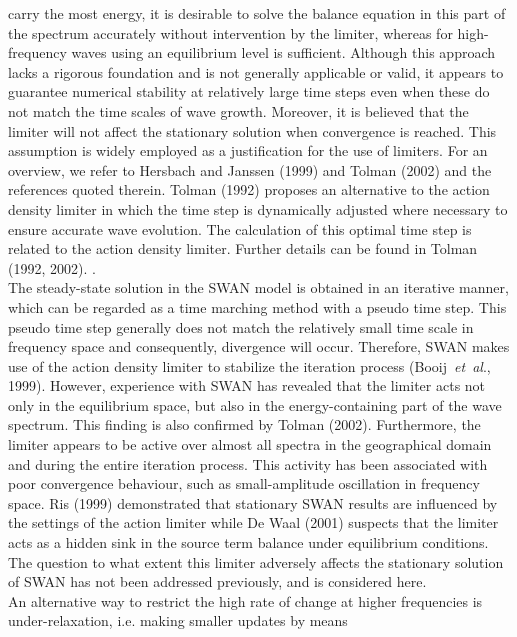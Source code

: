 \documentclass[12pt]{book}
\begin{document}
carry the most energy, it is desirable to solve the balance equation in this
part of the spectrum accurately without intervention by the limiter, whereas
for high-frequency waves using an equilibrium level is sufficient. Although this approach lacks a rigorous
foundation and is not generally applicable or valid, it appears to
guarantee numerical stability at relatively large time steps even when these
do not match the time scales of wave growth. Moreover, it is believed that
the limiter will not affect the stationary solution when convergence is
reached. This assumption is widely employed as a justification for the use of
limiters. For an overview, we refer to Hersbach and Janssen (1999) and
Tolman (2002) and the references quoted therein.
Tolman (1992) proposes an alternative to the action
density limiter in which the time step is
dynamically adjusted where necessary to ensure accurate wave evolution. The calculation of
this optimal time step is related to the action density limiter. Further details can be
found in Tolman (1992, 2002).
\nocite{Her99J,Tol02}.
\\[2ex]
\noindent
The steady-state solution in the SWAN model is obtained in an iterative manner,
which can be regarded as a time marching method
with a pseudo time step.
This pseudo time step generally does not match the relatively small time scale in frequency space
and consequently, divergence will occur.
Therefore, SWAN makes use of the action density limiter to stabilize the iteration process
(Booij~{\it et~al}., 1999). However, experience with SWAN has revealed that
the limiter acts not only in the equilibrium space, but also in the energy-containing part of the
wave spectrum. This finding is also confirmed by Tolman (2002). Furthermore, the
limiter appears to be active over almost all spectra in the geographical domain
and during the entire iteration process. This activity has been associated
with poor convergence behaviour, such as small-amplitude oscillation in frequency space. Ris
(1999) demonstrated that stationary SWAN results are influenced by the settings of the action
limiter while De Waal (2001) suspects that the limiter acts as a hidden sink
in the source term balance under equilibrium conditions. The question to
what extent this limiter adversely affects the stationary solution of SWAN has not
been addressed previously, and is considered here.
\nocite{Boo99RH,Tol02,Ris99,DeW01}
\\[2ex]
\noindent
An alternative way to restrict the high rate of change
at higher frequencies is under-relaxation, i.e. making smaller updates by means
\end{document}
